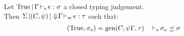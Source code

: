 
\begin{theorem}[Principality]
  Let $\inferS{\Ctrue}{\E}{e}{\schm}$ a closed typing judgement.\\
  Then $\inferW{\Sv}{(C,\unif)}{\Eflat\E}{e}{\tau}$
  such that:
  \begin{align*}
    (\Ctrue,\schm_o) &= \generalize{C}{\unif\E}{\tau}
    &\entail{&}{\schm_o \preceq \schm}
  \end{align*}


\end{theorem}

